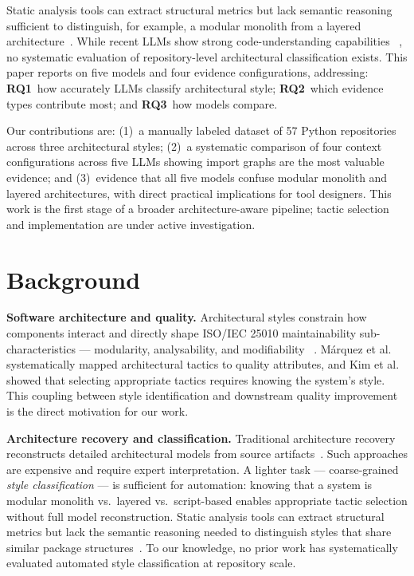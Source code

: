 \documentclass[runningheads]{llncs}
\begin{document}
Static analysis tools can extract structural metrics but lack semantic reasoning sufficient to distinguish, for example, a modular monolith from a layered architecture~\cite{lenarduzzi2023critical}. While recent LLMs show strong code-understanding capabilities~\cite{liu2025exploring} \cite{piao2025refactoring}, no systematic evaluation of repository-level architectural classification exists. This paper reports on five models and four evidence configurations, addressing: \textbf{RQ1}~how accurately LLMs classify architectural style; \textbf{RQ2}~which evidence types contribute most; and \textbf{RQ3}~how models compare.

Our contributions are: (1)~a manually labeled dataset of 57 Python repositories across three architectural styles; (2)~a systematic comparison of four context configurations across five LLMs showing import graphs are the most valuable evidence; and (3)~evidence that all five models confuse modular monolith and layered architectures, with direct practical implications for tool designers. This work is the first stage of a broader architecture-aware pipeline; tactic selection and implementation are under active investigation.
\section{Background}
\label{sec:background}

\textbf{Software architecture and quality.}
Architectural styles constrain how components interact and directly shape ISO/IEC 25010 maintainability sub-characteristics --- modularity, analysability, and modifiability~\cite{bass2021software} \cite{ISO25010}. M\'arquez et al.~\cite{marquez2022architectural} systematically mapped architectural tactics to quality attributes, and Kim et al.~\cite{kim2009qualitydriven} showed that selecting appropriate tactics requires knowing the system's style. This coupling between style identification and downstream quality improvement is the direct motivation for our work.

\textbf{Architecture recovery and classification.}
Traditional architecture recovery reconstructs detailed architectural models from source artifacts~\cite{shokri2024ipsynth}. Such approaches are expensive and require expert interpretation. A lighter task --- coarse-grained \textit{style classification} --- is sufficient for automation: knowing that a system is modular monolith vs.\ layered vs.\ script-based enables appropriate tactic selection without full model reconstruction. Static analysis tools can extract structural metrics but lack the semantic reasoning needed to distinguish styles that share similar package structures~\cite{lenarduzzi2023critical}. To our knowledge, no prior work has systematically evaluated automated style classification at repository scale.
\end{document}

